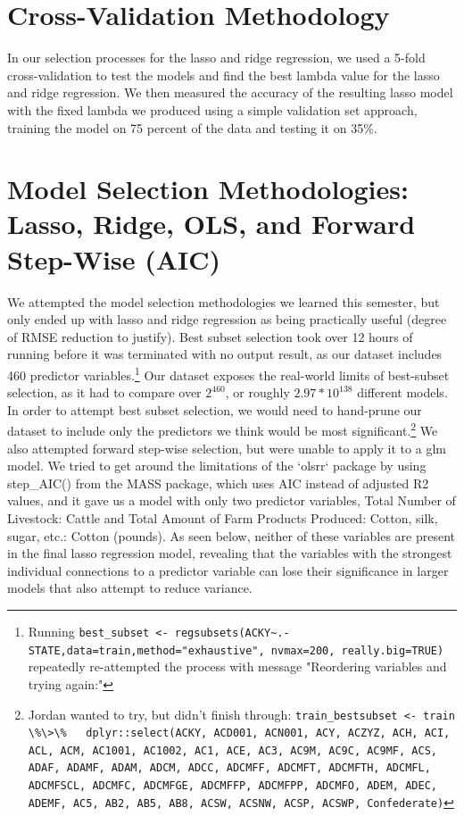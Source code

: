 \documentclass[a4paper,12pt]{article}
\begin{document}
\section{Cross-Validation Methodology}
In our selection processes for the lasso and ridge regression, we used a 5-fold cross-validation to test the models and find the best lambda value for the lasso and ridge regression. We then measured the accuracy of the resulting lasso model with the fixed lambda we produced using a simple validation set approach, training the model on 75 percent of the data and testing it on 35\%.

\section{Model Selection Methodologies: Lasso, Ridge, OLS, and Forward Step-Wise (AIC)}
We attempted the model selection methodologies we learned this semester, but only ended up with lasso and ridge regression as being practically useful (degree of RMSE reduction to justify). Best subset selection took over 12 hours of running before it was terminated with no output result, as our dataset includes 460 predictor variables.\footnote{Running \lstinline{best_subset <- regsubsets(ACKY~.-STATE,data=train,method="exhaustive", nvmax=200, really.big=TRUE)} repeatedly re-attempted the process with message "Reordering variables and trying again:"}
Our dataset exposes the real-world limits of best-subset selection, as it had to compare over $2^{460}$, or roughly $2.97 * 10^{138}$ different models. In order to attempt best subset selection, we would need to hand-prune our dataset to include only the predictors we think would be most significant.\footnote{Jordan wanted to try, but didn't finish through: \lstinline{train_bestsubset <- train \%\>\%
  dplyr::select(ACKY, ACD001, ACN001, ACY, ACZYZ, ACH, ACI, ACL, ACM, AC1001, AC1002, AC1, ACE, AC3, AC9M, AC9C, AC9MF, ACS, ADAF, ADAMF, ADAM, ADCM, ADCC, ADCMFF, ADCMFT, ADCMFTH, ADCMFL, ADCMFSCL, ADCMFC, ADCMFGE, ADCMFFP, ADCMFPP, ADCMFO, ADEM, ADEC, ADEMF, AC5, AB2, AB5, AB8, ACSW, ACSNW, ACSP, ACSWP, Confederate)}}    
  We also attempted forward step-wise selection, but were unable to apply it to a glm model. We tried to get around the limitations of the `olsrr` package by using step\_AIC() from the MASS package, which uses AIC instead of adjusted R2 values, and it gave us a model with only two predictor variables, Total Number of Livestock: Cattle and Total Amount of Farm Products Produced: Cotton, silk, sugar, etc.: Cotton (pounds). As seen below, neither of these variables are present in the final lasso regression model, revealing that the variables with the strongest individual connections to a predictor variable can lose their significance in larger models that also attempt to reduce variance.
\end{document}
